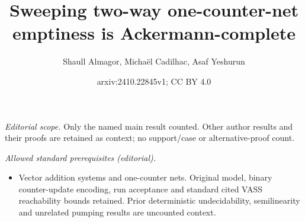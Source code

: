 \documentclass[11pt,a4paper]{amsart}
\title{Sweeping two-way one-counter-net emptiness is Ackermann-complete}
\author{Shaull Almagor, Michaël Cadilhac, Asaf Yeshurun}
\date{arxiv:2410.22845v1; CC BY 4.0}
\theoremstyle{definition}
\begin{document}
\maketitle
\noindent\textit{Editorial scope.} Only the named main result counted. Other author results and their proofs are retained as context; no support/case or alternative-proof count.\par\medskip
\noindent\textit{Allowed standard prerequisites (editorial).}\begin{itemize}
\item Vector addition systems and one-counter nets. Original model, binary counter-update encoding, run acceptance and standard cited VASS reachability bounds retained. Prior deterministic undecidability, semilinearity and unrelated pumping results are uncounted context.
\end{itemize}\medskip
\end{document}
